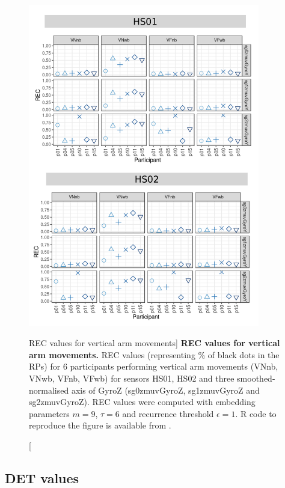 \begin{figure}
\centering
\includegraphics[width=0.9\textwidth]{rqa_rec_V_w500}
    \caption
	[REC values for vertical arm movements]{
	{\bf REC values for vertical arm movements.}
	REC values (representing \% of black dots in the RPs) for 
	6 participants performing vertical arm movements 
	(VNnb, VNwb, VFnb, VFwb)
	for sensors HS01, HS02 and three smoothed-normalised axis 
	of GyroZ (sg0zmuvGyroZ, sg1zmuvGyroZ and sg2zmuvGyroZ).
	REC values were computed with 
	embedding parameters $m=9$, $\tau=6$ and recurrence threshold
	$\epsilon=1$.
	R code to reproduce the figure is available from \cite{xochicale2018}.
        }
    \label{fig:rqa_rec_V}
\end{figure}


\newpage
\subsection{DET values}

